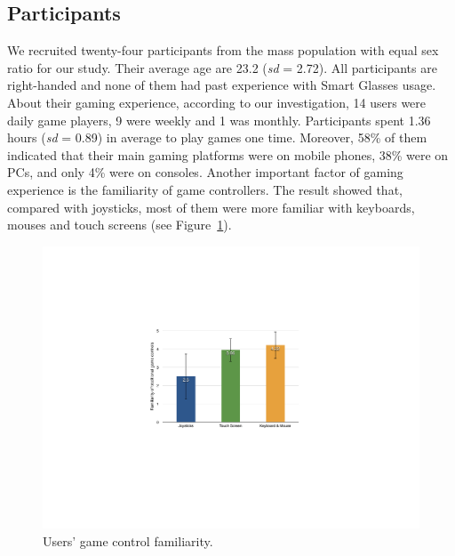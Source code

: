 \documentclass{sigchi}
\begin{document}
  \subsection {Participants}
  We recruited twenty-four participants from the mass population with equal sex ratio for our study. Their average age are 23.2 (\textsl{sd} = 2.72). All participants are right-handed and none of them had past experience with Smart Glasses usage. About their gaming experience, according to our investigation, 14 users were daily game players, 9 were weekly and 1 was monthly. Participants spent 1.36 hours (\textsl{sd} = 0.89) in average to play games one time. Moreover, 58\% of them indicated that their main gaming platforms were on mobile phones, 38\% were on PCs, and only 4\% were on consoles. Another important factor of gaming experience is the familiarity of game controllers. The result showed that, compared with joysticks, most of them were more familiar with keyboards, mouses and touch screens (see Figure~\ref{fig:figureFamiliarity}).
  \begin{figure}[!h]
  \centering
  \includegraphics[width=1\columnwidth]{Familiarity.pdf}
  \caption{Users' game control familiarity.}
  \label{fig:figureFamiliarity}
  \end{figure}   
\end{document}
